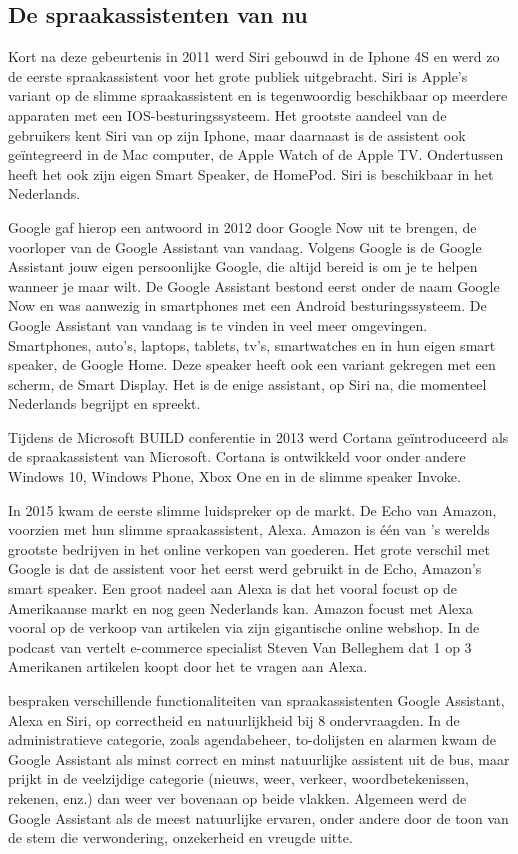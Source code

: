 \subsection{De spraakassistenten van nu}
\label{ss:de spraakassistenten van nu}
Kort na deze gebeurtenis in 2011 werd Siri gebouwd in de Iphone 4S en werd zo de eerste spraakassistent voor het grote publiek uitgebracht. Siri is Apple's variant op de slimme spraakassistent en is tegenwoordig beschikbaar op meerdere apparaten met een IOS-besturingssysteem. Het grootste aandeel van de gebruikers kent Siri van op zijn Iphone, maar daarnaast is de assistent ook geïntegreerd in de Mac computer, de Apple Watch of de Apple TV. Ondertussen heeft het ook zijn eigen Smart Speaker, de HomePod. Siri is beschikbaar in het Nederlands.

Google gaf hierop een antwoord in 2012 door Google Now uit te brengen, de voorloper van de Google Assistant van vandaag. Volgens Google is de Google Assistant jouw eigen persoonlijke Google, die altijd bereid is om je te helpen wanneer je maar wilt. De Google Assistant bestond eerst onder de naam Google Now en was aanwezig in smartphones met een Android besturingssysteem. De Google Assistant van vandaag is te vinden in veel meer omgevingen. Smartphones, auto's, laptops, tablets, tv's, smartwatches en in hun eigen smart speaker, de Google Home. Deze speaker heeft ook een variant gekregen met een scherm, de Smart Display. Het is de enige assistant, op Siri na, die momenteel Nederlands begrijpt en spreekt.

Tijdens de Microsoft BUILD conferentie in 2013 werd Cortana geïntroduceerd als de spraakassistent van Microsoft. Cortana is ontwikkeld voor onder andere Windows 10, Windows Phone, Xbox One en in de slimme speaker Invoke.

In 2015 kwam de eerste slimme luidspreker op de markt. De Echo van Amazon, voorzien met hun slimme spraakassistent, Alexa. Amazon is één van 's werelds grootste bedrijven in het online verkopen van goederen. Het grote verschil met Google is dat de assistent voor het eerst werd gebruikt in de Echo, Amazon's smart speaker. Een groot nadeel aan Alexa is dat het vooral focust op de Amerikaanse markt en nog geen Nederlands kan. Amazon focust met Alexa vooral op de verkoop van artikelen via zijn gigantische online webshop. In de podcast van \textcite{Belghmidi2019a} vertelt e-commerce specialist Steven Van Belleghem dat 1 op 3 Amerikanen artikelen koopt door het te vragen aan Alexa.

\textcite{Lopez2018} bespraken verschillende functionaliteiten van spraakassistenten Google Assistant, Alexa en Siri, op correctheid en natuurlijkheid bij 8 ondervraagden. In de administratieve categorie, zoals agendabeheer, to-dolijsten en alarmen kwam de Google Assistant als minst correct en minst natuurlijke assistent uit de bus, maar prijkt in de veelzijdige categorie (nieuws, weer, verkeer, woordbetekenissen, rekenen, enz.) dan weer ver bovenaan op beide vlakken. Algemeen werd de Google Assistant als de meest natuurlijke ervaren, onder andere door de toon van de stem die verwondering, onzekerheid en vreugde uitte.

